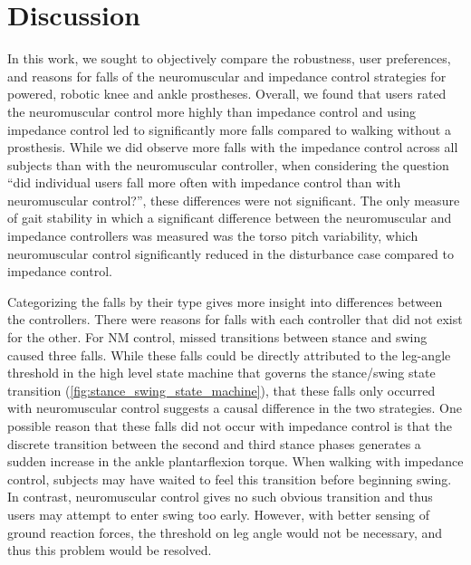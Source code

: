 \section{Discussion}

In this work, we sought to objectively compare the robustness, user preferences,
and reasons for falls of the neuromuscular and impedance control strategies for
powered, robotic knee and ankle prostheses. Overall, we found that users rated
the neuromuscular control more highly than impedance control and using impedance
control led to significantly more falls compared to walking without a
prosthesis. While we did observe more falls with the impedance control across
all subjects than with the neuromuscular controller, when considering the
question ``did individual users fall more often with impedance control than with
neuromuscular control?'', these differences were not significant. The only
measure of gait stability in which a significant difference between the
neuromuscular and impedance controllers was measured was the torso pitch
variability, which neuromuscular control significantly reduced in the
disturbance case compared to impedance control.

Categorizing the falls by their type gives more insight into differences between
the controllers. There were reasons for falls with each controller that did not
exist for the other. For NM control, missed transitions between stance and swing
caused three falls. While these falls could be directly attributed to the
leg-angle threshold in the high level state machine that governs the
stance/swing state transition (\cref{fig:stance_swing_state_machine}), that
these falls only occurred with neuromuscular control suggests a causal
difference in the two strategies. One possible reason that these falls did not
occur with impedance control is that the discrete transition between the second
and third stance phases generates a sudden increase in the ankle plantarflexion
torque. When walking with impedance control, subjects may have waited to feel
this transition before beginning swing. In contrast, neuromuscular control gives
no such obvious transition and thus users may attempt to enter swing too early.
However, with better sensing of ground reaction forces, the threshold on leg
angle would not be necessary, and thus this problem would be resolved.

